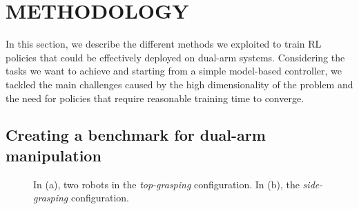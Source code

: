 \documentclass[letterpaper, 10 pt, conference]{ieeeconf}  %
\begin{document}
\section{METHODOLOGY}

In this section, we describe the different methods we exploited to train RL policies that could be effectively deployed on dual-arm systems. Considering the tasks we want to achieve and starting from a simple model-based controller, we tackled the main challenges caused by the high dimensionality of the problem and the need for policies that require reasonable training time to converge.

\subsection{Creating a benchmark for dual-arm manipulation}

\begin{figure}[t]
    \centering    
    \caption{In (a), two robots in the \textit{top-grasping} configuration. In (b), the \textit{side-grasping} configuration.}
    \label{grasping-strategy}
\end{figure}
\end{document}
